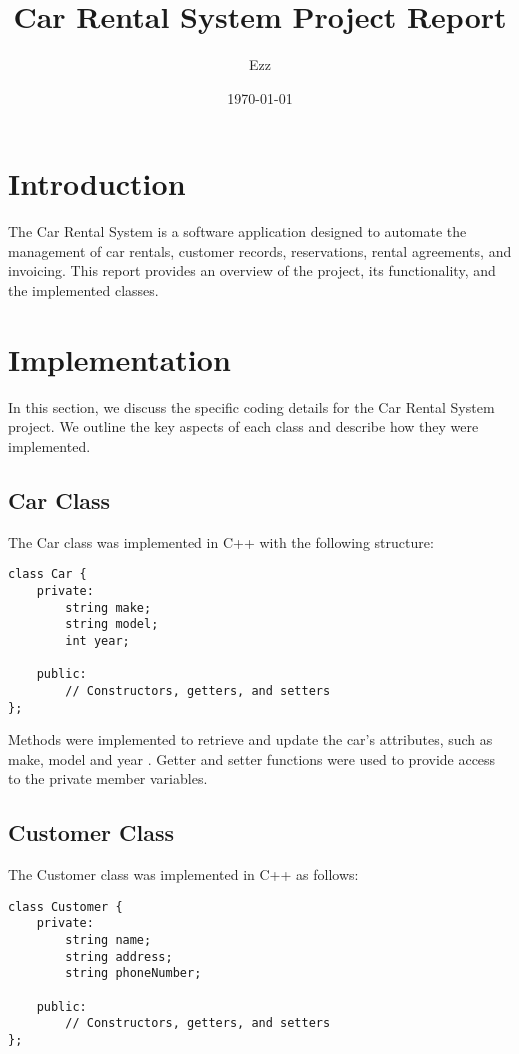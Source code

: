 \documentclass{article}
\title{Car Rental System Project Report}
\author{Ezz}
\date{\today}
\begin{document}
\maketitle

\section{Introduction}
The Car Rental System is a software application designed to automate the management of car rentals, customer records, reservations, rental agreements, and invoicing. This report provides an overview of the project, its functionality, and the implemented classes.


\section{Implementation}

In this section, we discuss the specific coding details for the Car Rental System project. We outline the key aspects of each class and describe how they were implemented.

\subsection{Car Class}
The Car class was implemented in C++ with the following structure:

\begin{verbatim}
class Car {
    private:
        string make;
        string model;
        int year;
    
    public:
        // Constructors, getters, and setters
};
\end{verbatim}

Methods were implemented to retrieve and update the car's attributes, such as make, model and year . Getter and setter functions were used to provide access to the private member variables.


\subsection{Customer Class}
The Customer class was implemented in C++ as follows:

\begin{verbatim}
class Customer {
    private:
        string name;
        string address;
        string phoneNumber;
    
    public:
        // Constructors, getters, and setters
};
\end{verbatim}
\end{document}
